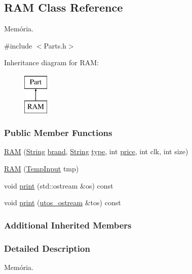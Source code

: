 \subsection{R\+AM Class Reference}
\label{class_r_a_m}


Memória.  




{\ttfamily \#include $<$Parts.\+h$>$}

Inheritance diagram for R\+AM\+:\begin{figure}[H]
\begin{center}
\leavevmode
\includegraphics[height=2.000000cm]{class_r_a_m}
\end{center}
\end{figure}
\subsubsection*{Public Member Functions}
\begin{DoxyCompactItemize}
\item 
\mbox{\hyperlink{class_r_a_m_a1869d6bd505e7fb58b809270626c82f2}{R\+AM}} (\mbox{\hyperlink{class_string}{String}} \mbox{\hyperlink{class_part_ae06f2fdeb7fbbdb229a7aca151f3e341}{brand}}, \mbox{\hyperlink{class_string}{String}} \mbox{\hyperlink{class_part_a101dbcc5c4b21564df7414c7eb0eae88}{type}}, int \mbox{\hyperlink{class_part_a8e71223aed1da95a974f33d8d6c91bb1}{price}}, int clk, int size)
\item 
\mbox{\hyperlink{class_r_a_m_a9c54d554dfa8c3fc9c7c2d87e8dbe28f}{R\+AM}} (\mbox{\hyperlink{struct_temp_input}{Temp\+Input}} tmp)
\item 
void \mbox{\hyperlink{class_r_a_m_a2f226659cbc23f841d73525572ba9574}{print}} (std\+::ostream \&os) const
\item 
void \mbox{\hyperlink{class_r_a_m_a11a874dd6cf99454efd6b7a1d20a3737}{print}} (\mbox{\hyperlink{structutos__ostream}{utos\+\_\+ostream}} \&tos) const
\end{DoxyCompactItemize}
\subsubsection*{Additional Inherited Members}


\subsubsection{Detailed Description}
Memória. 

